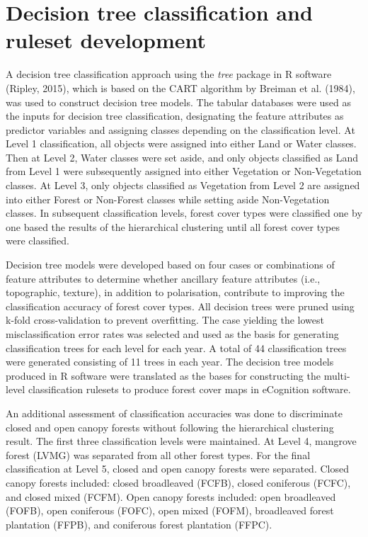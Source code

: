\section{Decision tree classification and ruleset development}
\label{sec: method-decision-tree}

A decision tree classification approach using the \textit{tree} package in R software (Ripley, 2015), which is based on the CART algorithm by Breiman et al. (1984), was used to construct decision tree models. The tabular databases were used as the inputs for decision tree classification, designating the feature attributes as predictor variables and assigning classes depending on the classification level. At Level 1 classification, all objects were assigned into either Land or Water classes. Then at Level 2, Water classes were set aside, and only objects classified as Land from Level 1 were subsequently assigned into either Vegetation or Non-Vegetation classes. At Level 3, only objects classified as Vegetation from Level 2 are assigned into either Forest or Non-Forest classes while setting aside Non-Vegetation classes. In subsequent classification levels, forest cover types were classified one by one based the results of the hierarchical clustering until all forest cover types were classified.

Decision tree models were developed based on four cases or combinations of feature attributes to determine whether ancillary feature attributes (i.e., topographic, texture), in addition to polarisation, contribute to improving the classification accuracy of forest cover types. All decision trees were pruned using k-fold cross-validation to prevent overfitting. The case yielding the lowest misclassification error rates was selected and used as the basis for generating classification trees for each level for each year. A total of 44 classification trees were generated consisting of 11 trees in each year. The decision tree models produced in R software were translated as the bases for constructing the multi-level classification rulesets to produce forest cover maps in eCognition software.

An additional assessment of classification accuracies was done to discriminate closed and open canopy forests without following the hierarchical clustering result. The first three classification levels were maintained. At Level 4, mangrove forest (LVMG) was separated from all other forest types. For the final classification at Level 5, closed and open canopy forests were separated. Closed canopy forests included: closed broadleaved (FCFB), closed coniferous (FCFC), and closed mixed (FCFM). Open canopy forests included: open broadleaved (FOFB), open coniferous (FOFC), open mixed (FOFM), broadleaved forest plantation (FFPB), and coniferous forest plantation (FFPC).
